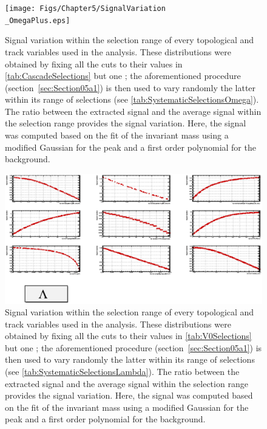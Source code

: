 \begin{landscape}
\begin{figure}[h]
	\centering
	\texttt{[image: Figs/Chapter5/SignalVariation\\\_OmegaPlus.eps]}
\caption{Signal variation within the selection range of every topological and track variables used in the \rmAomegaP analysis. These distributions were obtained by fixing all the cuts to their values in \tab\ref{tab:CascadeSelections} but one ; the aforementioned procedure (section~\ref{sec:Section05a1}) is then used to vary randomly the latter within its range of selections (see \tab\ref{tab:SystematicSelectionsOmega}). The ratio between the extracted signal and the average signal within the selection range provides the signal variation. Here, the signal was computed based on the fit of the invariant mass using a modified Gaussian for the peak and a first order polynomial for the background.}
	\label{fig:SignalVariation_TopoSel_OmegaPlus}
\end{figure}

\begin{figure}[h]
	\centering
	\includegraphics[width=1.45\textwidth]{Figs/Chapter5/SignalVariation_Lambda.eps}
\caption{Signal variation within the selection range of every topological and track variables used in the \rmLambda analysis. These distributions were obtained by fixing all the cuts to their values in \tab\ref{tab:V0Selections} but one ; the aforementioned procedure (section~\ref{sec:Section05a1}) is then used to vary randomly the latter within its range of selections (see \tab\ref{tab:SystematicSelectionsLambda}). The ratio between the extracted signal and the average signal within the selection range provides the signal variation. Here, the signal was computed based on the fit of the invariant mass using a modified Gaussian for the peak and a first order polynomial for the background.}
	\label{fig:SignalVariation_TopoSel_Lambda}
\end{figure}


\end{landscape}
